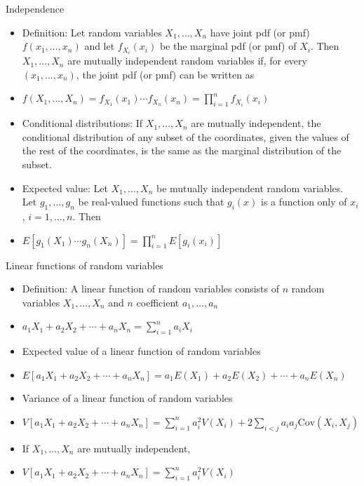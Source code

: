 \documentclass{article}
\newcommand{\cov}[1]{\mathrm{Cov}(#1)}		%
\newcommand{\vecn}[2]{#1_1, \ldots, #1_{#2}}	%
\begin{document}
Independence
\begin{itemize}
    \item Definition: Let random variables $\vecn{X}{n}$ have joint pdf (or pmf) $f(\vecn{x}{n})$ and let $f_{X_i}(x_i)$ be the marginal pdf (or pmf) of $X_i$. Then $\vecn{X}{n}$ are mutually independent random variables if, for every $(\vecn{x}{n})$, the joint pdf (or pmf) can be written as
    \item[] $\displaystyle f(\vecn{X}{n}) = f_{X_1}(x_1) \cdots f_{X_n}(x_n) = \prod_{i = 1}^n f_{X_i}(x_i)$
    \item Conditional distributions: If $\vecn{X}{n}$ are mutually independent, the conditional distribution of any subset of the coordinates, given the values of the rest of the coordinates, is the same as the marginal distribution of the subset.
    \item Expected value: Let $\vecn{X}{n}$  be mutually independent random variables. Let $\vecn{g}{n}$ be real-valued functions such that $g_i(x)$ is a function only of $x_i$, $i = 1, \dots, n$. Then
    \item[] $\displaystyle E[g_1(X_1) \cdots g_n(X_n)] = \prod_{i = 1}^n E[g_i(x_i)]$
\end{itemize}\bigskip

\newpage

Linear functions of random variables
\begin{itemize}
    \item Definition: A linear function of random variables consists of $n$ random variables $\vecn{X}{n}$ and $n$ coefficient $\vecn{a}{n}$
    \item[] $\displaystyle a_1 X_1 + a_2 X_2 + \cdots + a_n X_n = \sum_{i = 1}^n a_i X_i$
    \item Expected value of a linear function of random variables
    \item[] $E[a_1 X_1 + a_2 X_2+ \cdots + a_n X_n] = a_1 E(X_1) + a_2 E(X_2) + \cdots + a_n E(X_n)$
    \item Variance of a linear function of random variables
    \item[] $\displaystyle V[a_1 X_1 + a_2 X_2+ \cdots + a_n X_n] = \sum_{i = 1}^n a_i^2 V(X_i) + 2 \sum_{i < j} a_i a_j \cov{X_i,X_j}$
    \item[] If $\vecn{X}{n}$ are mutually independent,
    \item[] $\displaystyle V[a_1 X_1 + a_2 X_2+ \cdots + a_n X_n] = \sum_{i = 1}^n a_i^2 V(X_i)$
\end{itemize}\bigskip
\end{document}
